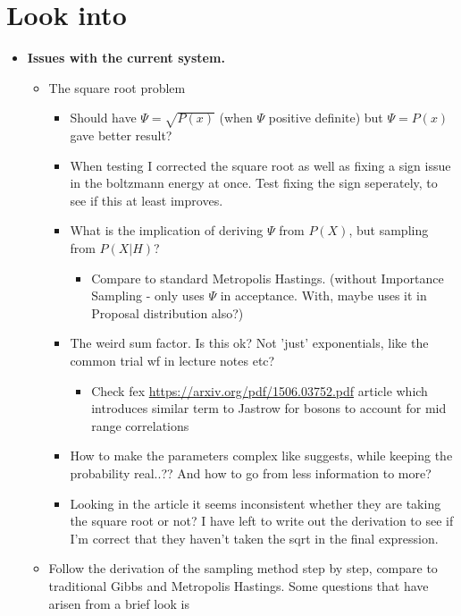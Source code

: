 \documentclass[norsk,a4paper,11pt]{article}
\begin{document}
\section{Look into}

\begin{itemize}
	\item \textbf{Issues with the current system.} 
	\begin{itemize}
		\item The square root problem
		\begin{itemize}
			\item Should have $\Psi = \sqrt{P(x)}$ (when $\Psi$ positive definite) but $\Psi= P(x)$ gave better result?
			\item When testing I corrected the square root as well as fixing a sign issue in the boltzmann energy at once. Test fixing the sign seperately, to see if this at least improves.
			\item What is the implication of deriving $\Psi$ from $P(X)$, but sampling from $P(X|H)$?
			\begin{itemize}
				\item Compare to standard Metropolis Hastings. (without Importance Sampling - only uses $\Psi$ in acceptance. With, maybe uses it in Proposal distribution also?)
			\end{itemize}
			\item The weird sum factor. Is this ok? Not 'just' exponentials, like the common trial wf in lecture notes etc?
			\begin{itemize}
				\item Check fex \url{https://arxiv.org/pdf/1506.03752.pdf} article which introduces similar term to Jastrow for bosons to account for mid range correlations
			\end{itemize}
			\item How to make the parameters complex like \cite{solveQMann} suggests, while keeping the probability real..?? And how to go from less information to more?
			\item Looking in the article \cite{solveQMann} it seems inconsistent whether they are taking the square root or not? I have left to write out the derivation to see if I'm correct that they haven't taken the sqrt in the final expression.
		\end{itemize}
		\item Follow the derivation of the sampling method step by step, compare to traditional Gibbs and Metropolis Hastings. Some questions that have arisen from a brief look is

\end{itemize}
\end{itemize}
\end{document}
